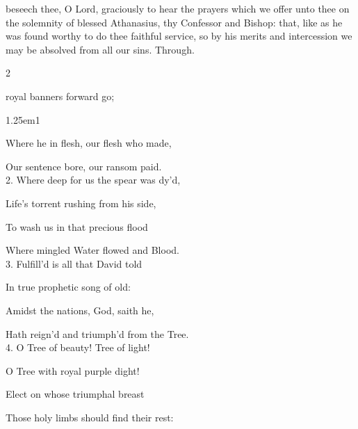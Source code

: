 {} beseech thee, O Lord, graciously to hear the prayers which we offer unto thee on the solemnity of blessed Athanasius, thy Confessor and Bishop: that, like as he was found worthy to do thee faithful service, so by his merits and intercession we may be absolved from all our sins. Through.


\clearpage
{}\label{InventionCross}


\begin{paracol}{2}
\sloppy

\vspace{-2\baselineskip}

\firstEvensong
{}

\firstEvensongHymn
{} royal banners forward go;


\begin{hangparas}{1.25em}{1}

Where he in flesh, our flesh who made,

Our sentence bore, our ransom paid.\\

2. Where deep for us the spear was dy'd,

Life's torrent rushing from his side,

To wash us in that precious flood

Where mingled Water flowed and Blood.\\

3. Fulfill'd is all that David told

In true prophetic song of old:

Amidst the nations, God, saith he,

Hath reign'd and triumph'd from the Tree.\\

4. O Tree of beauty! Tree of light!

O Tree with royal purple dight!

Elect on whose triumphal breast

Those holy limbs should find their rest:\\


\end{hangparas}
\end{paracol}
